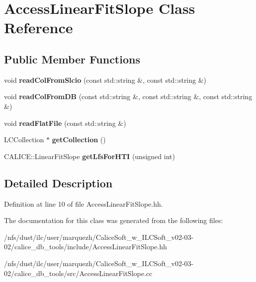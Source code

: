 \section{Access\-Linear\-Fit\-Slope Class Reference}
\label{classAccessLinearFitSlope}
\subsection*{Public Member Functions}
\begin{DoxyCompactItemize}
\item 
void {\bfseries read\-Col\-From\-Slcio} (const std\-::string \&, const std\-::string \&)\label{classAccessLinearFitSlope_a52795c034f950ce9fd1d05951db604ae}

\item 
void {\bfseries read\-Col\-From\-D\-B} (const std\-::string \&, const std\-::string \&, const std\-::string \&)\label{classAccessLinearFitSlope_afe938bb75433e822e8b971fd21a4e6c0}

\item 
void {\bfseries read\-Flat\-File} (const std\-::string \&)\label{classAccessLinearFitSlope_aac63b1162f6b5a8f3a5b994489162372}

\item 
L\-C\-Collection $\ast$ {\bfseries get\-Collection} ()\label{classAccessLinearFitSlope_a1ccfef95405c28a0c89226e8b39dd040}

\item 
C\-A\-L\-I\-C\-E\-::\-Linear\-Fit\-Slope {\bfseries get\-Lfs\-For\-H\-T\-I} (unsigned int)\label{classAccessLinearFitSlope_aa7566f58698566f85f0f5bd1fb13fb86}

\end{DoxyCompactItemize}


\subsection{Detailed Description}


Definition at line 10 of file Access\-Linear\-Fit\-Slope.\-hh.



The documentation for this class was generated from the following files\-:\begin{DoxyCompactItemize}
\item 
/nfs/dust/ilc/user/marquezh/\-Calice\-Soft\-\_\-w\-\_\-\-I\-L\-C\-Soft\-\_\-v02-\/03-\/02/calice\-\_\-db\-\_\-tools/include/Access\-Linear\-Fit\-Slope.\-hh\item 
/nfs/dust/ilc/user/marquezh/\-Calice\-Soft\-\_\-w\-\_\-\-I\-L\-C\-Soft\-\_\-v02-\/03-\/02/calice\-\_\-db\-\_\-tools/src/Access\-Linear\-Fit\-Slope.\-cc\end{DoxyCompactItemize}
